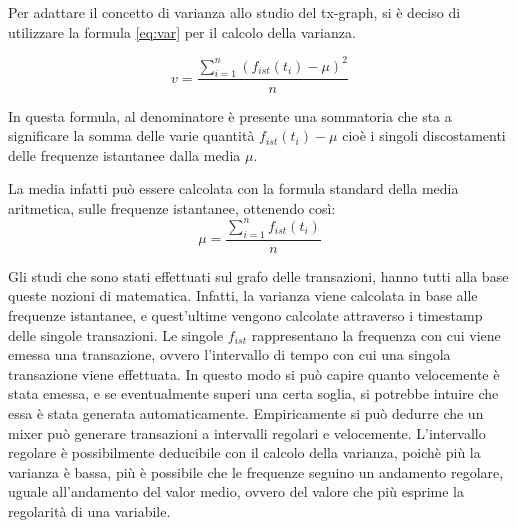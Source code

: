 Per adattare il concetto di varianza allo studio del tx-graph, si è deciso di utilizzare la formula \ref{eq:var} per il calcolo della varianza.

\begin{equation}
v =  \frac{ \sum_{i=1}^n (f_{ist}(t_i) - \mu )^2 }{n}
\label{eq:var}
\end{equation}

In questa formula, al denominatore è presente una sommatoria che sta a significare la somma delle varie quantità $f_{ist}(t_i) - \mu$ cioè i singoli discostamenti delle frequenze istantanee dalla media $\mu$.

La media infatti può essere calcolata con la formula standard della media aritmetica, sulle frequenze istantanee, ottenendo così:
\begin{equation}
	\mu = \frac{\sum_{i=1}^{n} f_{ist}(t_i)}{n}
\end{equation}

Gli studi che sono stati effettuati sul grafo delle transazioni, hanno tutti alla base queste nozioni di matematica. Infatti, la varianza viene calcolata in base alle frequenze istantanee, e quest'ultime vengono calcolate attraverso i timestamp delle singole transazioni. Le singole $f_{ist}$ rappresentano la frequenza con cui viene emessa una transazione, ovvero l'intervallo di tempo con cui una singola transazione viene effettuata. In questo modo si può capire quanto velocemente è stata emessa, e se eventualmente superi una certa soglia, si potrebbe intuire che essa è stata generata automaticamente. Empiricamente si può dedurre che un mixer può generare transazioni a intervalli regolari e velocemente. L'intervallo regolare è possibilmente deducibile con il calcolo della varianza, poichè più la varianza è bassa, più è possibile che le frequenze seguino un andamento regolare, uguale all'andamento del valor medio, ovvero del valore che più esprime la regolarità di una variabile.